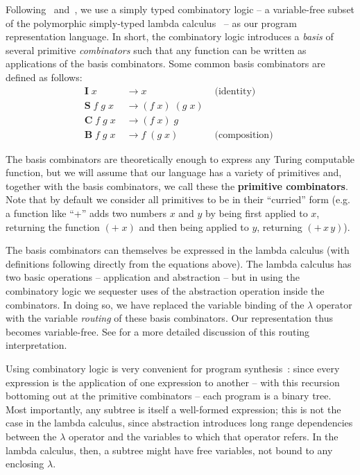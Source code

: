 \documentclass{article}
\begin{document}
Following~\cite{liang10programs} and~\cite{briggs2006functional}, we use a
simply typed combinatory logic -- a variable-free subset of the
polymorphic simply-typed lambda calculus~\cite{Pierce_2002} -- as our
program representation language. In short, the combinatory logic
introduces a \emph{basis} of several primitive \emph{combinators} such
that any function can be written as applications of the basis
combinators. Some common basis combinators are defined as follows:
\begin{align}
\mathbf{I}\; x &\rightarrow  x & \text{ (identity) }\\
\mathbf{S}\; f\; g\; x\; &\rightarrow (f\; x)\; (g\; x)\\ 
\mathbf{C}\; f\; g\; x\; &\rightarrow (f\; x)\; g  \\ 
\mathbf{B}\; f\; g\; x\; &\rightarrow f\; (g\; x) & \text{ (composition) }
\end{align}

The basis combinators are theoretically enough to express any Turing
computable function, but we will assume that our language has a
variety of primitives and, together with the basis combinators, we
call these the \textbf{primitive combinators}. Note that by default we consider
all primitives to be in their ``curried'' form (e.g. a function like
``+'' adds two numbers $x$ and $y$ by being first applied to $x$,
returning the function $(+\;x)$ and then being applied to $y$,
returning $(+\,x\,y)$\;).

The basis combinators can themselves be expressed in the lambda
calculus (with definitions following directly from the equations
above). The lambda calculus has two basic operations -- application
and abstraction -- but in using the
combinatory logic we sequester uses of the abstraction operation
inside the combinators. In doing so, we have replaced the variable
binding of the $\lambda$ operator with the variable \emph{routing} of
these basis combinators. Our representation thus becomes
variable-free. See \cite{liang10programs} for a more
detailed discussion of this routing interpretation.

Using combinatory logic is very convenient for program
synthesis~\cite{briggs2006functional}: since every expression is the
application of one expression to another -- with this recursion
bottoming out at the primitive combinators -- each program is a binary
tree. Most importantly, any subtree is itself a well-formed
expression; this is not the case in the lambda calculus, since
abstraction introduces long range dependencies between the $\lambda$
operator and the variables to which that operator refers. In the
lambda calculus, then, a subtree might have free variables, not bound
to any enclosing $\lambda$.
\end{document}
